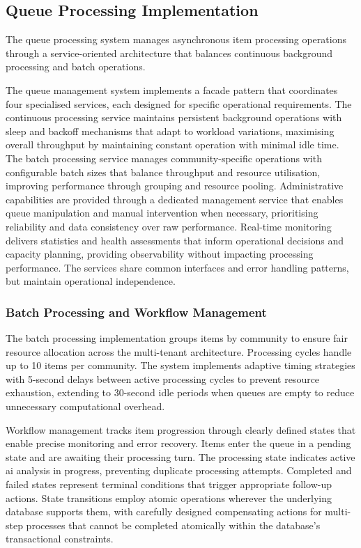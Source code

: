 

\subsection{Queue Processing Implementation} \label{subsection:queue_processing}

The queue processing system manages asynchronous item processing operations through a service-oriented architecture that balances continuous background processing and batch operations.

The queue management system implements a facade pattern that coordinates four specialised services, each designed for specific operational requirements. The continuous processing service maintains persistent background operations with sleep and backoff mechanisms that adapt to workload variations, maximising overall throughput by maintaining constant operation with minimal idle time. The batch processing service manages community-specific operations with configurable batch sizes that balance throughput and resource utilisation, improving performance through grouping and resource pooling. Administrative capabilities are provided through a dedicated management service that enables queue manipulation and manual intervention when necessary, prioritising reliability and data consistency over raw performance. Real-time monitoring delivers statistics and health assessments that inform operational decisions and capacity planning, providing observability without impacting processing performance. The services share common interfaces and error handling patterns, but maintain operational independence.

\subsubsection{Batch Processing and Workflow Management}

The batch processing implementation groups items by community to ensure fair resource allocation across the multi-tenant architecture. Processing cycles handle up to 10 items per community. The system implements adaptive timing strategies with 5-second delays between active processing cycles to prevent resource exhaustion, extending to 30-second idle periods when queues are empty to reduce unnecessary computational overhead.

Workflow management tracks item progression through clearly defined states that enable precise monitoring and error recovery. Items enter the queue in a pending state and are awaiting their processing turn. The processing state indicates active \ac{ai} analysis in progress, preventing duplicate processing attempts. Completed and failed states represent terminal conditions that trigger appropriate follow-up actions. State transitions employ atomic operations wherever the underlying database supports them, with carefully designed compensating actions for multi-step processes that cannot be completed atomically within the database's transactional constraints.

